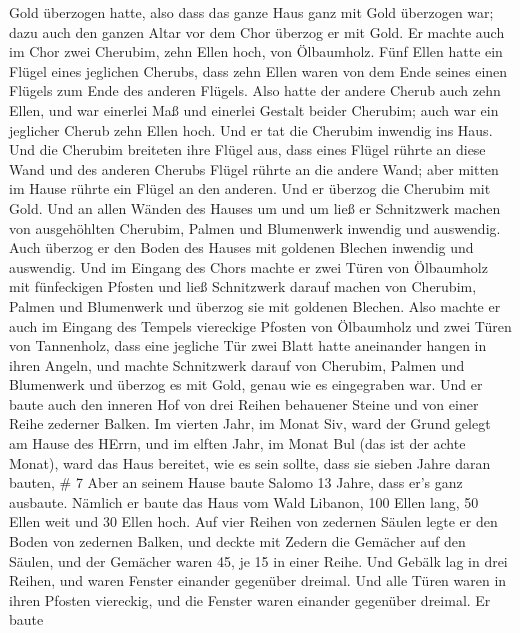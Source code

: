 Gold überzogen hatte,  also dass das ganze Haus ganz mit
Gold überzogen war; dazu auch den ganzen Altar vor dem Chor überzog er
mit Gold.  Er machte auch im Chor zwei Cherubim, zehn Ellen
hoch, von Ölbaumholz.  Fünf Ellen hatte ein Flügel eines
jeglichen Cherubs, dass zehn Ellen waren von dem Ende seines einen
Flügels zum Ende des anderen Flügels.  Also hatte der
andere Cherub auch zehn Ellen, und war einerlei Maß und einerlei Gestalt
beider Cherubim;  auch war ein jeglicher Cherub zehn Ellen
hoch.  Und er tat die Cherubim inwendig ins Haus. Und die
Cherubim breiteten ihre Flügel aus, dass eines Flügel rührte an diese
Wand und des anderen Cherubs Flügel rührte an die andere Wand; aber
mitten im Hause rührte ein Flügel an den anderen.  Und er
überzog die Cherubim mit Gold.  Und an allen Wänden des
Hauses um und um ließ er Schnitzwerk machen von ausgehöhlten Cherubim,
Palmen und Blumenwerk inwendig und auswendig.  Auch überzog
er den Boden des Hauses mit goldenen Blechen inwendig und auswendig.
 Und im Eingang des Chors machte er zwei Türen von
Ölbaumholz mit fünfeckigen Pfosten  und ließ Schnitzwerk
darauf machen von Cherubim, Palmen und Blumenwerk und überzog sie mit
goldenen Blechen.  Also machte er auch im Eingang des
Tempels viereckige Pfosten von Ölbaumholz  und zwei Türen
von Tannenholz, dass eine jegliche Tür zwei Blatt hatte aneinander
hangen in ihren Angeln,  und machte Schnitzwerk darauf von
Cherubim, Palmen und Blumenwerk und überzog es mit Gold, genau wie es
eingegraben war.  Und er baute auch den inneren Hof von
drei Reihen behauener Steine und von einer Reihe zederner Balken.
 Im vierten Jahr, im Monat Siv, ward der Grund gelegt am
Hause des HErrn,  und im elften Jahr, im Monat Bul (das ist
der achte Monat), ward das Haus bereitet, wie es sein sollte, dass sie
sieben Jahre daran bauten, \# 7  Aber an seinem Hause baute
Salomo 13 Jahre, dass er's ganz ausbaute.  Nämlich er baute
das Haus vom Wald Libanon, 100 Ellen lang, 50 Ellen weit und 30 Ellen
hoch. Auf vier Reihen von zedernen Säulen legte er den Boden von
zedernen Balken,  und deckte mit Zedern die Gemächer auf den
Säulen, und der Gemächer waren 45, je 15 in einer Reihe. 
Und Gebälk lag in drei Reihen, und waren Fenster einander gegenüber
dreimal.  Und alle Türen waren in ihren Pfosten viereckig,
und die Fenster waren einander gegenüber dreimal.  Er baute
